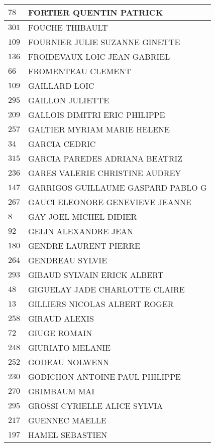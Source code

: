 \begin{xltabular}{\linewidth}{|l|X|}
    \hline
    $78$ & FORTIER QUENTIN PATRICK \\
    \hline
    $301$ & FOUCHE THIBAULT \\
    \hline
    $109$ & FOURNIER JULIE SUZANNE GINETTE \\
    \hline
    $136$ & FROIDEVAUX LOIC JEAN GABRIEL \\
    \hline
    $66$ & FROMENTEAU CLEMENT \\
    \hline
    $109$ & GAILLARD LOIC \\
    \hline
    $295$ & GAILLON JULIETTE \\
    \hline
    $209$ & GALLOIS DIMITRI ERIC PHILIPPE \\
    \hline
    $257$ & GALTIER MYRIAM MARIE HELENE \\
    \hline
    $34$ & GARCIA CEDRIC \\
    \hline
    $315$ & GARCIA PAREDES ADRIANA BEATRIZ \\
    \hline
    $236$ & GARES VALERIE CHRISTINE AUDREY \\
    \hline
    $147$ & GARRIGOS GUILLAUME GASPARD PABLO G \\
    \hline
    $267$ & GAUCI ELEONORE GENEVIEVE JEANNE \\
    \hline
    $8$ & GAY JOEL MICHEL DIDIER \\
    \hline
    $92$ & GELIN ALEXANDRE JEAN \\
    \hline
    $180$ & GENDRE LAURENT PIERRE \\
    \hline
    $264$ & GENDREAU SYLVIE \\
    \hline
    $293$ & GIBAUD SYLVAIN ERICK ALBERT \\
    \hline
    $48$ & GIGUELAY JADE CHARLOTTE CLAIRE \\
    \hline
    $13$ & GILLIERS NICOLAS ALBERT ROGER \\
    \hline
    $258$ & GIRAUD ALEXIS \\
    \hline
    $72$ & GIUGE ROMAIN \\
    \hline
    $248$ & GIURIATO MELANIE \\
    \hline
    $252$ & GODEAU NOLWENN \\
    \hline
    $230$ & GODICHON ANTOINE PAUL PHILIPPE \\
    \hline
    $270$ & GRIMBAUM MAI \\
    \hline
    $295$ & GROSSI CYRIELLE ALICE SYLVIA \\
    \hline
    $217$ & GUENNEC MAELLE \\
    \hline
    $197$ & HAMEL SEBASTIEN \\

\end{xltabular}
